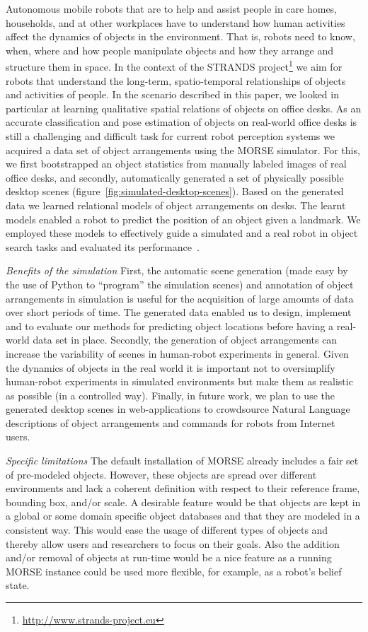 \documentclass[conference]{IEEEtran}
\begin{document}
Autonomous mobile robots that are to help and assist people in care homes,
households, and at other workplaces have to understand how human activities
affect the dynamics of objects in the environment. That is, robots need to know,
when, where and how people manipulate objects and how they arrange and structure
them in space. In the context of the STRANDS
project\footnote{\url{http://www.strands-project.eu}} we aim for robots that
understand the long-term, spatio-temporal relationships of objects and
activities of people. In the scenario described in this paper, we looked in
particular at learning qualitative spatial relations of objects on office desks.
As an accurate classification and pose estimation of objects on real-world
office desks is still a challenging and difficult task for current robot
perception systems we acquired a data set of object arrangements using the MORSE
simulator. For this, we first bootstrapped an object statistics from manually
labeled images of real office desks, and secondly, automatically generated a set
of physically possible desktop scenes
(figure~\ref{fig:simulated-desktop-scenes}). Based on the generated data we
learned relational models of object arrangements on desks. The learnt models
enabled a robot to predict the position of an object given a landmark. We
employed these models to effectively guide a simulated and a real robot in
object search tasks and evaluated its performance~\cite{kunze14indirect}.

\emph{Benefits of the simulation} First, the automatic scene generation (made
easy by the use of Python to ``program'' the simulation scenes) and annotation
of object arrangements in simulation is useful for the acquisition of large
amounts of data over short periods of time. The generated data enabled us to
design, implement and to evaluate our methods for predicting object locations
before having a real-world data set in place. Secondly, the generation of object
arrangements can increase the variability of scenes in human-robot experiments
in general. Given the dynamics of objects in the real world it is important not
to oversimplify human-robot experiments in simulated environments but make them
as realistic as possible (in a controlled way). Finally, in future work, we plan
to use the generated desktop scenes in web-applications to crowdsource Natural
Language descriptions of object arrangements and commands for robots from
Internet users.

\emph{Specific limitations} The default installation of MORSE already includes a
fair set of pre-modeled objects. However, these objects are spread over
different environments and lack a coherent definition with respect to their
reference frame, bounding box, and/or scale. A desirable feature would be that
objects are kept in a global or some domain specific object databases and that
they are modeled in a consistent way. This would ease the usage of different
types of objects and thereby allow users and researchers to focus on their
goals. Also the addition and/or removal of objects at run-time would be a nice
feature as a running MORSE instance could be used more flexible, for example,
as a robot's belief state.
\end{document}
